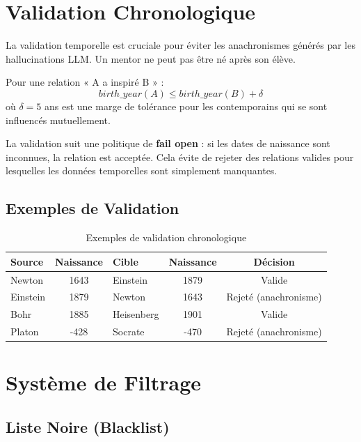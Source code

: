 \documentclass[12pt,a4paper]{report}
\begin{document}
\section{Validation Chronologique}

La validation temporelle est cruciale pour éviter les anachronismes générés par les hallucinations LLM. Un mentor ne peut pas être né après son élève.

\begin{infobox}
Pour une relation « A a inspiré B » :
$$birth\_year(A) \leq birth\_year(B) + \delta$$
où $\delta = 5$ ans est une marge de tolérance pour les contemporains qui se sont influencés mutuellement.
\end{infobox}

La validation suit une politique de \textbf{fail open} : si les dates de naissance sont inconnues, la relation est acceptée. Cela évite de rejeter des relations valides pour lesquelles les données temporelles sont simplement manquantes.

\subsection{Exemples de Validation}

\begin{table}[H]
\centering
\begin{tabular}{|l|c|l|c|c|}
\hline
\rowcolor{warning!20}
\textbf{Source} & \textbf{Naissance} & \textbf{Cible} & \textbf{Naissance} & \textbf{Décision} \\
\hline
Newton & 1643 & Einstein & 1879 & \textcolor{success}{Valide} \\
\hline
Einstein & 1879 & Newton & 1643 & \textcolor{danger}{Rejeté (anachronisme)} \\
\hline
Bohr & 1885 & Heisenberg & 1901 & \textcolor{success}{Valide} \\
\hline
Platon & -428 & Socrate & -470 & \textcolor{danger}{Rejeté (anachronisme)} \\
\hline
\end{tabular}
\caption{Exemples de validation chronologique}
\end{table}

\section{Système de Filtrage}

\subsection{Liste Noire (Blacklist)}
\end{document}
